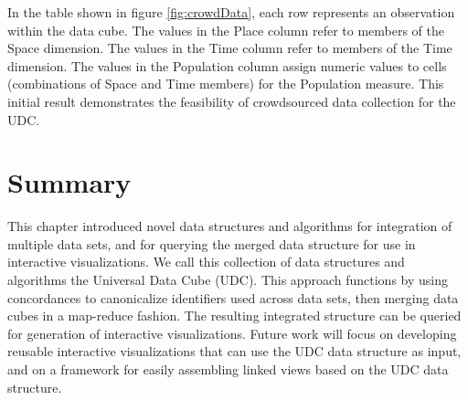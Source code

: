 In the table shown in figure \ref{fig:crowdData}, each row represents an observation within the data cube. The values in the Place column refer to members of the Space dimension. The values in the Time column refer to members of the Time dimension. The values in the Population column assign numeric values to cells (combinations of Space and Time members) for the Population measure. This initial result demonstrates the feasibility of crowdsourced data collection for the UDC.

\section{Summary}
This chapter introduced novel data structures and algorithms for integration of multiple data sets, and for querying the merged data structure for use in interactive visualizations. We call this collection of data structures and algorithms the Universal Data Cube (UDC). This approach functions by using concordances to canonicalize identifiers used across data sets, then merging data cubes in a map-reduce fashion. The resulting integrated structure can be queried for generation of interactive visualizations. Future work will focus on developing reusable interactive visualizations that can use the UDC data structure as input, and on a framework for easily assembling linked views based on the UDC data structure.


